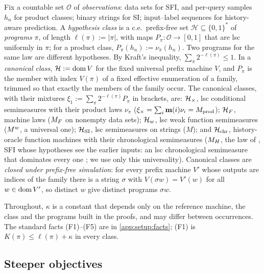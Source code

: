 \begin{definition}\label{def:setup:class}
Fix a countable set $\mathcal O$ of \emph{observations}: data sets for SFI, and per-query samples $h_n$ for product classes; binary strings for SI; input--label sequences for history-aware prediction. A \emph{hypothesis class} is a c.e.\ prefix-free set $\mathcal H\subseteq\{0,1\}^*$ of \emph{programs} $\pi$, of length $\ell(\pi):=|\pi|$, with maps $P_\pi:\mathcal O\to[0,1]$ that are lsc uniformly in $\pi$; for a product class, $P_\pi(h_n):=\nu_\pi(h_n)$. Two programs for the same law are different hypotheses. By Kraft's inequality, $\sum_\pi2^{-\ell(\pi)}\le1$.
In a \emph{canonical class}, $\mathcal H:=\operatorname{dom} V$ for the fixed universal prefix machine $V$, and $P_\pi$ is the member with index $V(\pi)$ of a fixed effective enumeration of a family, trimmed so that exactly the members of the family occur. The canonical classes, with their mixtures $\xi_1:=\sum_\pi2^{-\ell(\pi)}P_\pi$ in brackets, are: $\mathcal{H}_{\times}$, lsc conditional semimeasures with their product laws $\nu_\pi$ ($\xi_\times=\sum_i\mathbf{m}(i)\nu_i=M_{\mathrm{prod}}$); $\mathcal{H}_{F}$, machine laws ($M_{F}$ on nonempty data sets); $\mathcal{H}_{w}$, lsc weak function semimeasures ($M^{w}$, a universal one); $\mathcal{H}_{\mathrm{SI}}$, lsc semimeasures on strings ($M$); and $\mathcal{H}_{\mathrm{chr}}$, history-oracle function machines with their chronological semimeasures ($M_{H}$, the law of \SFIhist{}, SFI whose hypotheses see the earlier inputs: an lsc chronological semimeasure that dominates every one \citep[Corollary~6.17(a)]{claudeSFI2026fundamentals}; we use only this universality). %
Canonical classes are \emph{closed under prefix-free simulation}: for every prefix machine $V'$ whose outputs are indices of the family there is a string $\sigma$ with $V(\sigma w)=V'(w)$ for all $w\in\operatorname{dom} V'$, so distinct $w$ give distinct programs $\sigma w$.
\end{definition}

Throughout, $\kappa$ is a constant that depends only on the reference machine, the class and the programs built in the proofs, and may differ between occurrences. The standard facts (F1)--(F5) are in \cref{app:setup:facts}; (F1) is $K(\pi)\le\ell(\pi)+\kappa$ in every class.

\subsection{Steeper objectives}\label{sec:setup:objectives}

